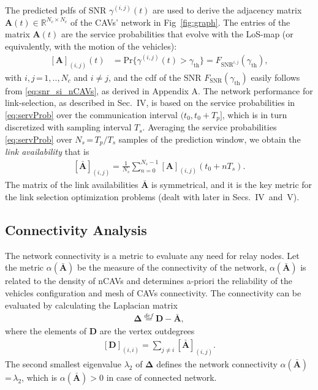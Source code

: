 \documentclass[journal]{IEEEtran}
\begin{document}
The predicted pdfs of SNR $\gamma^{(i,j)}(t)$ are used to derive the adjacency matrix $\mathbf{A}(t) \in \mathbb{R}^{N_c \times N_c}$ of the CAVs' network in Fig~\ref{fig:graph}.
The entries of the matrix $\mathbf{A}(t)$ are the service probabilities that evolve with the LoS-map (or equivalently, with the motion of the vehicles):  
\begin{align}\label{eq:servProb}
 \left[\mathbf{{A}}\right]_{(i,j)}(t)&=\text{Pr} {\{ \gamma^{(i,j)}(t)}>\gamma_{\text{th}} \}=  %
  F_{\mathrm{SNR}^{i,j}}(\gamma_{\text{th}}),
\end{align}
with $i,j$\,=\,$1,..,N_c$ and $i \neq j$, and the cdf of the SNR $F_{\mathrm{SNR}}(\gamma_{\text{th}})$ easily follows from \eqref{eq:snr_si_nCAVs}, as derived in Appendix A.
The network performance for link-selection, as described in Sec.~IV, is based on the service probabilities in \eqref{eq:servProb} over the communication interval $(t_0, t_0+T_p]$, which is in turn discretized with sampling interval $T_s$. 
Averaging the service probabilities  \eqref{eq:servProb} over $N_s$\,=\,$T_p/T_s$ samples of the prediction window, we obtain the \textit{link availability} that is
%
\begin{align} \label{eq:link_ava}
      \left[\mathbf{\bar{A}}\right]_{(i,j)}= \frac{1}{N_s}\sum_{n=0}^{N_s-1} { \left[\mathbf{{A}}\right]_{(i,j)}(t_0+nT_s)}.
\end{align}
%
The matrix of the link availabilities $\mathbf{\bar{A}}$ is symmetrical, and it is the key metric for the link selection optimization problems (dealt with later in Secs.~IV~and~V).

\subsection{Connectivity Analysis}

The network connectivity is a metric to evaluate any need for relay nodes. Let the metric $\alpha(\mathbf{\bar{A}})$ be the measure of the connectivity of the network, $\alpha(\mathbf{\bar{A}})$ is related to the density of nCAVs and determines a-priori the reliability of the vehicles configuration and mesh of CAVs connectivity. %
The connectivity can be evaluated by calculating the Laplacian matrix~\cite{jamakovic2007relationship}
\begin{align}\label{eq:laplacian}
    \mathbf{\Delta}\stackrel{def}{=} \mathbf{D}-\mathbf{\bar{A}},
\end{align}
where the elements of $\mathbf{D}$ are the vertex outdegrees 
\begin{align}
    \left[\mathbf{D}\right]_{(i,i)} = \sum_{j \neq i}    \left[\mathbf{\bar{A}}\right]_{(i,j)}.
\end{align}
The second smallest eigenvalue $\lambda_2$ of  $\mathbf{\Delta}$ defines the network connectivity $\alpha(\bar{\mathbf{A}})$\,=\,$\lambda_2$, which is $\alpha(\bar{\mathbf{A}}) > 0$ in case of connected network. 
\end{document}
